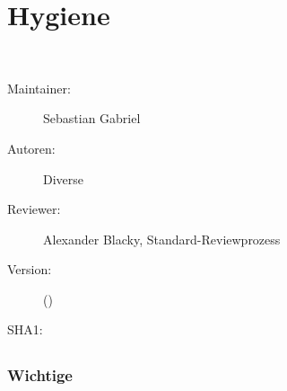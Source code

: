 % 
\def\ChapterCode{HYG}
\chapter
[\CO{[HYG]} Hygiene]
{Hygiene}
\label{chp:HYG}

\ChapterIntro
{%
~~
}
{%
\begin{description}
  \item[Maintainer:] Sebastian Gabriel
  \item[Autoren:] Diverse
  \item[Reviewer:] Alexander Blacky, Standard-Reviewprozess
  \item[Version:] {\VarDocVersionTypeName} ({\VarDocVersionTypeDescription})
  \item[SHA1:] {\DocGitCommit}
\end{description}

{\TxTeilkapitelAASS}
}

\nocite{Longmore2007}
\nocite{IntroClinEmergMed4}
\nocite{Boecker2}
\nocite{Fauci2008}
\nocite{ForthPharma8}

% 

\clearpage %
\section{}

\subsection{Wichtige }

